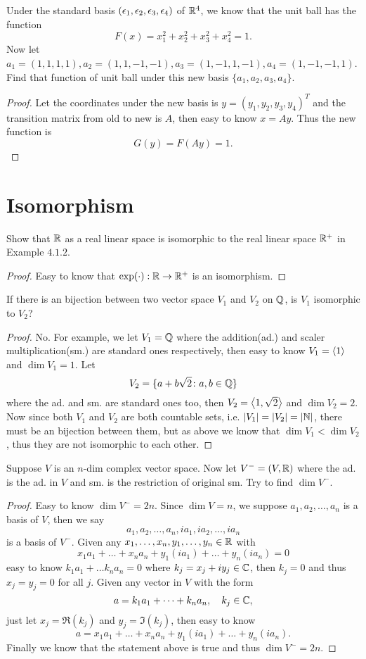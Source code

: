\begin{pro}%
	Under the standard basis $(\epsilon_1,\epsilon_2,\epsilon_3,\epsilon_4)$ of $\mathbb{R}^4$, we know that the unit ball has the function
	\[F(x)=x_1^2+x_2^2+x_3^2+x_4^2=1.\]
	Now let $a_1=(1,1,1,1),a_2=(1,1,-1,-1),a_3=(1,-1,1,-1),a_4=(1,-1,-1,1)$. Find that function of unit ball under this new basis $\{a_1,a_2,a_3,a_4\}$.
\end{pro}
\begin{proof}
	Let the coordinates under the new basis is $y=(y_1,y_2,y_3,y_4)^T$ and the transition matrix from old to new is $A$, then easy to know $x=Ay$. Thus the new function is
	\[G(y)=F(Ay)=1.\]
\end{proof}

\section{Isomorphism}
\begin{pro}%
	Show that $\mathbb{R}$ as a real linear space is isomorphic to the real linear space $\mathbb{R}^+$ in Example $4.1.2$.
\end{pro}
\begin{proof}
	Easy to know that $\exp(\cdot):\mathbb{R}\to\mathbb{R}^+$ is an isomorphism.
\end{proof}

\begin{pro}%
	If there is an bijection between two vector space $V_1$ and $V_2$ on $\mathbb{Q}$, is $V_1$ isomorphic to $V_2$?
\end{pro}
\begin{proof}
	No. For example, we let $V_1=\mathbb{Q}$ where the addition(ad.) and scaler multiplication(sm.) are standard ones respectively, then easy to know $V_1=\left\langle 1\right\rangle$ and $\dim V_1=1$. Let 
	\[V_2=\{a+b\sqrt{2}\colon a,b\in\mathbb{Q}\}\]
	where the ad. and sm. are standard ones too, then $V_2=\left\langle 1,\sqrt{2}\right\rangle$ and $\dim V_2=2$. Now since both $V_1$ and $V_2$ are both countable sets, i.e. $|V_1|=|V_2|=|\mathbb{N}|$, there must be an bijection between them, but as above we know that $\dim V_1<\dim V_2$, thus they are not isomorphic to each other.
\end{proof}

\begin{pro}%
	Suppose $V$ is an $n$-dim complex vector space. Now let $V^-=(V,\mathbb{R})$ where the ad. is the ad. in $V$ and sm. is the restriction of original sm. Try to find $\dim V^-$.
\end{pro}
\begin{proof}
	Easy to know $\dim V^-=2n$. Since $\dim V=n$, we suppose $a_1,a_2,\dots,a_n$ is a basis of $V$, then we say
	\[a_1,a_2,\dots,a_n,ia_1,ia_2,\dots,ia_n\]
	is a basis of $V^-$. Given any $x_1,\dots,x_n,y_1,\dots,y_n\in\mathbb{R}$ with
	\[x_1a_1+\dots +x_na_n+y_1(ia_1)+\dots +y_n(ia_n)=0\]
	easy to know $k_1a_1+\dots k_na_n=0$ where $k_j=x_j+iy_j\in \mathbb{C}$, then $k_j=0$ and thus $x_j=y_j=0$ for all $j$. 
	Given any vector in $V$ with the form 
	\[a=k_1a_1+\dots +k_na_n,\quad k_j\in\mathbb{C},\]
	just let $x_j=\Re(k_j)$ and $y_j=\Im(k_j)$, then easy to know
	\[a=x_1a_1+\dots +x_na_n+y_1(ia_1)+\dots +y_n(ia_n).\]
	Finally we know that the statement above is true and thus $\dim V^-=2n$.
\end{proof}

